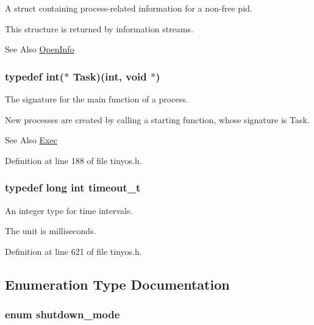 A struct containing process-\/related information for a non-\/free pid. 

This structure is returned by information streams. \begin{DoxySeeAlso}{See Also}
\hyperlink{group__syscalls_gaf326b11574cdc84a9e21b9d860076821}{Open\-Info} 
\end{DoxySeeAlso}
\hypertarget{group__syscalls_ga0c7678964128d7fccc9ce98528494f4a}{
\subsubsection[{Task}]{\setlength{\rightskip}{0pt plus 5cm}typedef int($\ast$ Task)(int, void $\ast$)}}\label{group__syscalls_ga0c7678964128d7fccc9ce98528494f4a}


The signature for the main function of a process. 

New processes are created by calling a starting function, whose signature is Task. \begin{DoxySeeAlso}{See Also}
\hyperlink{group__syscalls_ga737ad30d8105b4b76e3eb102dd016404}{Exec} 
\end{DoxySeeAlso}


Definition at line 188 of file tinyos.\-h.

\hypertarget{group__syscalls_ga036799055f409d83712b8c366aaa10d3}{
\subsubsection[{timeout\-\_\-t}]{\setlength{\rightskip}{0pt plus 5cm}typedef long int {\bf timeout\-\_\-t}}}\label{group__syscalls_ga036799055f409d83712b8c366aaa10d3}


An integer type for time intervals. 

The unit is milliseconds. 

Definition at line 621 of file tinyos.\-h.



\subsection{Enumeration Type Documentation}
\hypertarget{group__syscalls_ga9eb10a0a72ca3149140272e9344a272b}{
\subsubsection[{shutdown\-\_\-mode}]{\setlength{\rightskip}{0pt plus 5cm}enum {\bf shutdown\-\_\-mode}}}\label{group__syscalls_ga9eb10a0a72ca3149140272e9344a272b}


